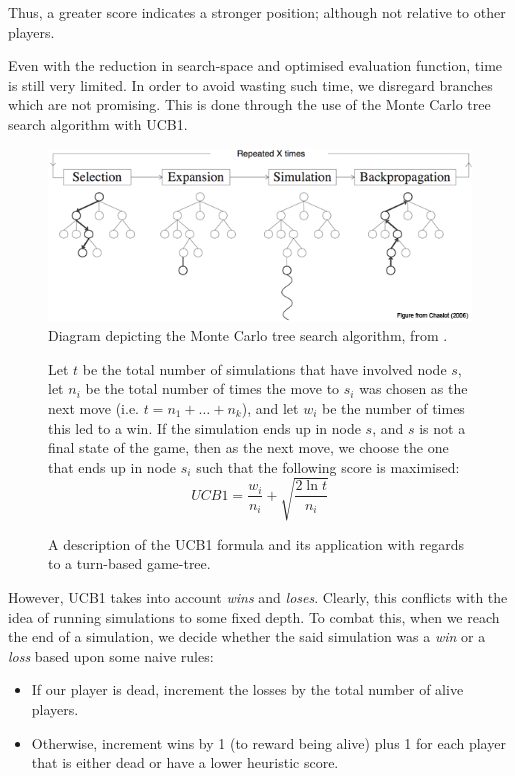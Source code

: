 \documentclass{standalone}
\begin{document}
		Thus, a greater score indicates a stronger position; although not relative to other players.

		Even with the reduction in search-space and optimised evaluation function, time is still very limited. In order to avoid wasting such time, we disregard branches which are not promising. This is done through the use of the Monte Carlo tree search algorithm \parencite{MonteCarloTreeSearch} with UCB1.

		\begin{figure}[!htbp]
			\centering
			\includegraphics[width=.8\textwidth]{resources/images/mcts.png}
			\caption{Diagram depicting the Monte Carlo tree search algorithm, from \parencite{MonteCarloTreeSearchDiagram}.}
		\end{figure}

		\begin{figure}
			\begin{formal}
				Let $t$ be the total number of simulations that have involved node $s$, let $n_i$ be the total number of times the move to $s_i$ was chosen as the next move (i.e. $t = n_1 + \ldots + n_k$), and let $w_i$ be the number of times this led to a win. If the simulation ends up in node $s$, and $s$ is not a final state of the game, then as the next move, we choose the one that ends up in node $s_i$ such that the following score is maximised:
				\[ UCB1 = \frac{w_i}{n_i} + \sqrt{\frac{2 \ln{t}}{n_i}} \]
				\caption{A description of the UCB1 formula and its application with regards to a turn-based game-tree.}
			\end{formal}
		\end{figure}

		However, UCB1 takes into account \emph{wins} and \emph{loses}. Clearly, this conflicts with the idea of running simulations to some fixed depth. To combat this, when we reach the end of a simulation, we decide whether the said simulation was a \emph{win} or a \emph{loss} based upon some naive rules:
		\begin{itemize}
			\item If our player is dead, increment the losses by the total number of alive players.
			\item Otherwise, increment wins by 1 (to reward being alive) plus 1 for each player that is either dead or have a lower heuristic score.
		\end{itemize}
\end{document}
